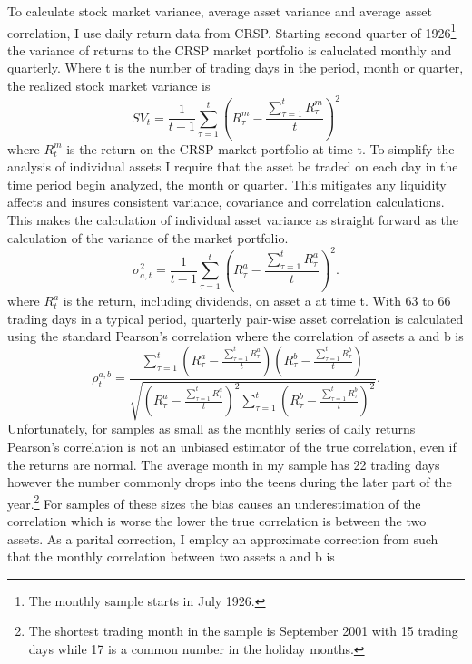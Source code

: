 To calculate stock market variance, average asset variance and average asset correlation, I use daily return data from CRSP. Starting second quarter of 1926\footnote{The monthly sample starts in July 1926.} the variance of returns to the CRSP market portfolio is caluclated monthly and quarterly. Where t is the number of trading days in the period, month or quarter, the realized stock market variance is
\begin{equation}
	SV_{t} = \frac{1}{t-1}\sum_{\tau = 1}^{t} \left(R^{m}_{\tau} - \frac{\sum_{\tau = 1}^{t} R^{m}_{\tau}}{t}\right)^{2}
\end{equation}
where $R^{m}_{t}$ is the return on the CRSP market portfolio at time t.
To simplify the analysis of individual assets I require that the asset be traded on each day in the time period begin analyzed, the month or quarter. This mitigates any liquidity affects and insures consistent variance, covariance and correlation calculations. This makes the calculation of individual asset variance as straight forward as the calculation of the variance of the market portfolio.
\begin{equation}
	\sigma^{2}_{a,t} = \frac{1}{t-1}\sum_{\tau = 1}^{t} \left(R^{a}_{\tau} - \frac{\sum_{\tau = 1}^{t} R^{a}_{\tau}}{t}\right)^{2}.
\end{equation}
where $R^{a}_{t}$ is the return, including dividends, on asset a at time t.
With 63 to 66 trading days in a typical period, quarterly pair-wise asset correlation is calculated using the standard Pearson's correlation where the correlation of assets a and b is
\begin{equation}
	\rho^{a,b}_{t} = \frac{\sum^{t}_{\tau = 1}\left(R^{a}_{\tau} - \frac{\sum_{\tau = 1}^{t} R^{a}_{\tau}}{t}\right)\left(R^{b}_{\tau} - \frac{\sum_{\tau = 1}^{t} R^{b}_{\tau}}{t}\right)}{\sqrt{\left(R^{a}_{\tau} - \frac{\sum_{\tau = 1}^{t} R^{a}_{\tau}}{t}\right)^{2}\sum_{\tau=1}^{t}\left(R^{b}_{\tau} - \frac{\sum_{\tau = 1}^{t} R^{b}_{\tau}}{t}\right)^{2} }}.
\end{equation}
Unfortunately, for samples as small as the monthly series of daily returns Pearson's correlation is not an unbiased estimator of the true correlation, even if the returns are normal.\cite{hotelling_1953} The average month in my sample has 22 trading days however the number commonly drops into the teens during the later part of the year.\footnote{The shortest trading month in the sample is September 2001 with 15 trading days while 17 is a common number in the holiday months.} For samples of these sizes the bias causes an underestimation of the correlation which is worse the lower the true correlation is between the two assets. As a parital correction, I employ an approximate correction from \cite{olkin_1958} such that the monthly correlation between two assets a and b is
